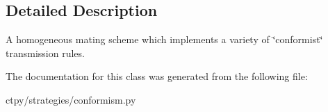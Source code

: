\subsection{Detailed Description}
A homogeneous mating scheme which implements a variety of \char`\"{}conformist\char`\"{} transmission rules. 

The documentation for this class was generated from the following file\-:\begin{DoxyCompactItemize}
\item 
ctpy/strategies/conformism.\-py\end{DoxyCompactItemize}

